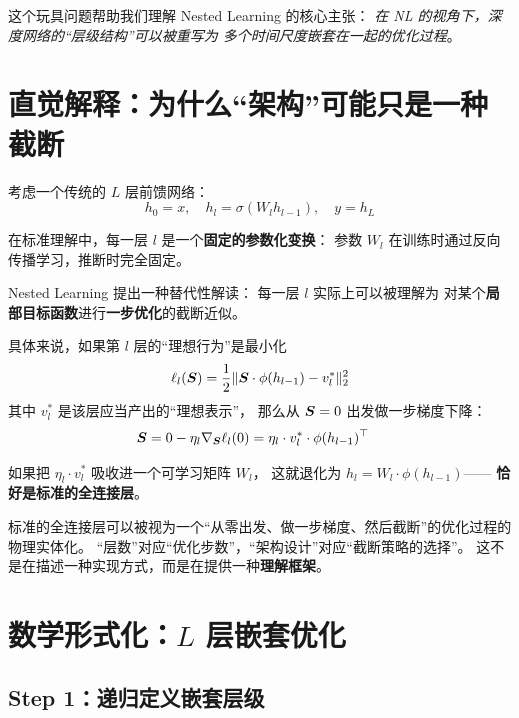 这个玩具问题帮助我们理解 Nested Learning 的核心主张：
\textit{在 NL 的视角下，深度网络的``层级结构''可以被重写为
多个时间尺度嵌套在一起的优化过程}。

\section{直觉解释：为什么``架构''可能只是一种截断}
\label{sec:nested_intuition}

考虑一个传统的 $L$ 层前馈网络：
\[
  h_0 = x, \quad h_l = \sigma(W_l h_{l-1}), \quad y = h_L
\]

在标准理解中，每一层 $l$ 是一个\textbf{固定的参数化变换}：
参数 $W_l$ 在训练时通过反向传播学习，推断时完全固定。

Nested Learning 提出一种替代性解读：
每一层 $l$ 实际上可以被理解为
对某个\textbf{局部目标函数}进行\textbf{一步优化}的截断近似。

具体来说，如果第 $l$ 层的``理想行为''是最小化
\begin{equation}
  \ell_l(\boldsymbol{S}) = \frac{1}{2}\|\boldsymbol{S} \cdot \phi(h_{l-1}) - v_l^*\|_2^2
  \label{eq:nested_local_loss}
\end{equation}
其中 $v_l^*$ 是该层应当产出的``理想表示''，
那么从 $\boldsymbol{S} = 0$ 出发做一步梯度下降：
\begin{align}
  \boldsymbol{S} &= 0 - \eta_l \nabla_{\boldsymbol{S}} \ell_l(0)
      = \eta_l \cdot v_l^* \cdot \phi(h_{l-1})^\top
\end{align}

如果把 $\eta_l \cdot v_l^*$ 吸收进一个可学习矩阵 $W_l$，
这就退化为 $h_l = W_l \cdot \phi(h_{l-1})$——
\textbf{恰好是标准的全连接层}。

\begin{insight}[title=深度层 = 优化截断]
标准的全连接层可以被视为一个``从零出发、做一步梯度、然后截断''的优化过程的物理实体化。
``层数''对应``优化步数''，``架构设计''对应``截断策略的选择''。
这不是在描述一种实现方式，而是在提供一种\textbf{理解框架}。
\end{insight}

\section{数学形式化：$L$ 层嵌套优化}
\label{sec:nested_math}

\subsection*{Step 1：递归定义嵌套层级}


